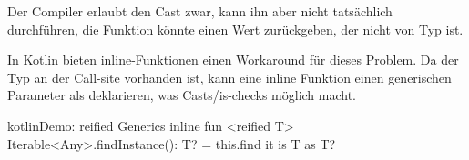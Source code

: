Der Compiler erlaubt den Cast zwar, kann ihn aber nicht tatsächlich durchführen, \dah die Funktion könnte einen Wert
zurückgeben, der nicht von Typ  ist.

In Kotlin bieten inline-Funktionen einen Workaround für dieses Problem.
Da der Typ an der Call-site vorhanden ist, kann eine inline Funktion einen generischen Parameter als
 deklarieren, was Casts/is-checks möglich macht.

\begin{codeBlock}{kotlin}{Demo: reified Generics}
inline fun <reified T> Iterable<Any>.findInstance(): T? = this.find { it is T } as T?
\end{codeBlock}

\renewcommand{\kapitelautor}{}
